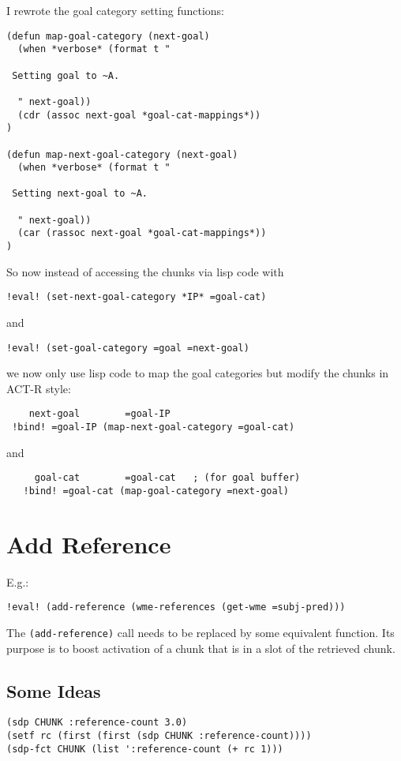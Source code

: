 \documentclass[nobf,fignum,doc,longtable]{apa}
\begin{document}
I rewrote the goal category setting functions:
{\scriptsize \begin{verbatim}
(defun map-goal-category (next-goal)
  (when *verbose* (format t "

 Setting goal to ~A.

  " next-goal))
  (cdr (assoc next-goal *goal-cat-mappings*))
)

(defun map-next-goal-category (next-goal)
  (when *verbose* (format t "

 Setting next-goal to ~A.

  " next-goal))
  (car (rassoc next-goal *goal-cat-mappings*))
)
\end{verbatim}}

So now instead of accessing the chunks via lisp code with
{\scriptsize \begin{verbatim}
!eval! (set-next-goal-category *IP* =goal-cat)
\end{verbatim}}
and
{\scriptsize \begin{verbatim}
!eval! (set-goal-category =goal =next-goal)
\end{verbatim}}
we now only use lisp code to map the goal categories but modify the chunks in ACT-R style:

{\scriptsize \begin{verbatim}
    next-goal        =goal-IP
 !bind! =goal-IP (map-next-goal-category =goal-cat)
\end{verbatim}}
and
{\scriptsize \begin{verbatim}
     goal-cat        =goal-cat   ; (for goal buffer)
   !bind! =goal-cat (map-goal-category =next-goal)      
\end{verbatim}}



\section{Add Reference}
E.g.:
{\small \begin{verbatim}
!eval! (add-reference (wme-references (get-wme =subj-pred)))
\end{verbatim}}

The \texttt{(add-reference)} call needs to be replaced by some equivalent function.
Its purpose is to boost activation of a chunk that is in a slot of the retrieved chunk.

\subsection{Some Ideas}
{\scriptsize \begin{verbatim}
(sdp CHUNK :reference-count 3.0)
(setf rc (first (first (sdp CHUNK :reference-count))))
(sdp-fct CHUNK (list ':reference-count (+ rc 1)))
\end{verbatim}}
\end{document}
